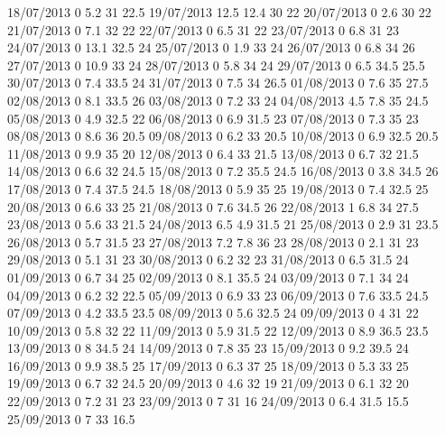 18/07/2013  0      5.2    31     22.5 
19/07/2013  12.5   12.4   30     22 
20/07/2013  0      2.6    30     22 
21/07/2013  0      7.1    32     22 
22/07/2013  0      6.5    31     22 
23/07/2013  0      6.8    31     23 
24/07/2013  0      13.1   32.5   24 
25/07/2013  0      1.9    33     24 
26/07/2013  0      6.8    34     26 
27/07/2013  0      10.9   33     24 
28/07/2013  0      5.8    34     24 
29/07/2013  0      6.5    34.5   25.5 
30/07/2013  0      7.4    33.5   24 
31/07/2013  0      7.5    34     26.5 
01/08/2013  0      7.6    35     27.5 
02/08/2013  0      8.1    33.5   26 
03/08/2013  0      7.2    33     24 
04/08/2013  4.5    7.8    35     24.5 
05/08/2013  0      4.9    32.5   22 
06/08/2013  0      6.9    31.5   23 
07/08/2013  0      7.3    35     23 
08/08/2013  0      8.6    36     20.5 
09/08/2013  0      6.2    33     20.5 
10/08/2013  0      6.9    32.5   20.5 
11/08/2013  0      9.9    35     20 
12/08/2013  0      6.4    33     21.5 
13/08/2013  0      6.7    32     21.5 
14/08/2013  0      6.6    32     24.5 
15/08/2013  0      7.2    35.5   24.5 
16/08/2013  0      3.8    34.5   26 
17/08/2013  0      7.4    37.5   24.5 
18/08/2013  0      5.9    35     25 
19/08/2013  0      7.4    32.5   25 
20/08/2013  0      6.6    33     25 
21/08/2013  0      7.6    34.5   26 
22/08/2013  1      6.8    34     27.5 
23/08/2013  0      5.6    33     21.5 
24/08/2013  6.5    4.9    31.5   21 
25/08/2013  0      2.9    31     23.5 
26/08/2013  0      5.7    31.5   23 
27/08/2013  7.2    7.8    36     23 
28/08/2013  0      2.1    31     23 
29/08/2013  0      5.1    31     23 
30/08/2013  0      6.2    32     23 
31/08/2013  0      6.5    31.5   24 
01/09/2013  0      6.7    34     25 
02/09/2013  0      8.1    35.5   24 
03/09/2013  0      7.1    34     24 
04/09/2013  0      6.2    32     22.5 
05/09/2013  0      6.9    33     23 
06/09/2013  0      7.6    33.5   24.5 
07/09/2013  0      4.2    33.5   23.5 
08/09/2013  0      5.6    32.5   24 
09/09/2013  0      4      31     22 
10/09/2013  0      5.8    32     22 
11/09/2013  0      5.9    31.5   22 
12/09/2013  0      8.9    36.5   23.5 
13/09/2013  0      8      34.5   24 
14/09/2013  0      7.8    35     23 
15/09/2013  0      9.2    39.5   24 
16/09/2013  0      9.9    38.5   25 
17/09/2013  0      6.3    37     25 
18/09/2013  0      5.3    33     25 
19/09/2013  0      6.7    32     24.5 
20/09/2013  0      4.6    32     19 
21/09/2013  0      6.1    32     20 
22/09/2013  0      7.2    31     23 
23/09/2013  0      7      31     16 
24/09/2013  0      6.4    31.5   15.5 
25/09/2013  0      7      33     16.5 
